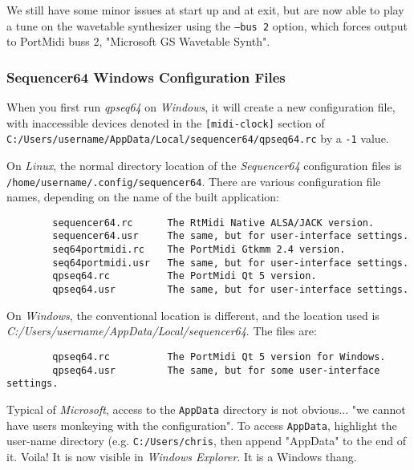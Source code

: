     We still have some minor issues at start up and at exit, but are now able
    to play a tune on the wavetable synthesizer using the
    \texttt{--bus 2} option, which forces output to PortMidi buss 2,
    "Microsoft GS Wavetable Synth".

\subsubsection{Sequencer64 Windows Configuration Files}
\label{subsubsec:qt_portmidi_windows_setup_config}

    When you first run \textsl{qpseq64}
    on \textsl{Windows}, it will create a new configuration
    file, with inaccessible devices denoted in the
    \texttt{[midi-clock]} section of
    \texttt{C:/Users/username/AppData/Local/sequencer64/qpseq64.rc}
    by a \texttt{-1} value.

    On \textsl{Linux},
    the normal directory location of the \textsl{Sequencer64} configuration
    files is
    \texttt{/home/username/.config/sequencer64}.  There are various
    configuration file names, depending on the name of the built application:

\begin{verbatim}
        sequencer64.rc      The RtMidi Native ALSA/JACK version.
        sequencer64.usr     The same, but for user-interface settings.
        seq64portmidi.rc    The PortMidi Gtkmm 2.4 version.
        seq64portmidi.usr   The same, but for user-interface settings.
        qpseq64.rc          The PortMidi Qt 5 version.
        qpseq64.usr         The same, but for user-interface settings.
\end{verbatim}

    On \textsl{Windows},
    the conventional location is different, and the location used
    is \textsl{C:/Users/username/AppData/Local/sequencer64}.
    The files are:

\begin{verbatim}
        qpseq64.rc          The PortMidi Qt 5 version for Windows.
        qpseq64.usr         The same, but for some user-interface settings.
\end{verbatim}

    Typical of \textsl{Microsoft}, access to the \texttt{AppData} directory
    is not obvious... "we cannot have users monkeying with the configuration".
    To access \texttt{AppData}, highlight the user-name directory
    (e.g. \texttt{C:/Users/chris}, then append
    "AppData" to the end of it.  Voila! It is now visible in
    \textsl{Windows Explorer}.
    It is a Windows thang.

